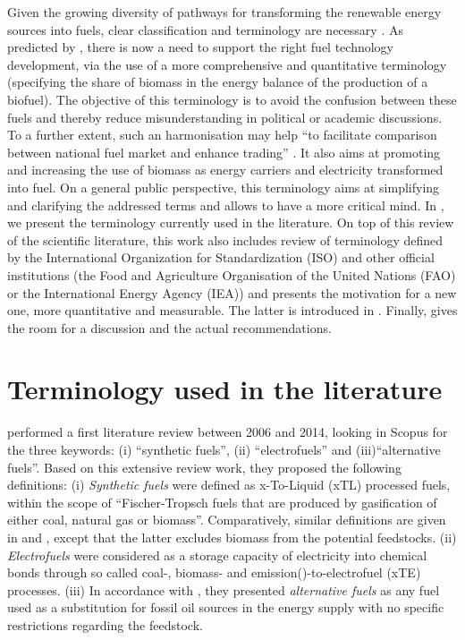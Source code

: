 Given the growing diversity of pathways for transforming the renewable energy sources into fuels, clear classification and terminology are necessary \cite{bailera2017}. As predicted by \citet{ridjan2016}, there is now a need to support the right fuel technology development, via the use of a more comprehensive and quantitative terminology (\eg specifying the share of biomass in the energy balance of the production of a biofuel). The objective of this terminology is to avoid the confusion between these fuels and thereby reduce misunderstanding in political or academic discussions. To a further extent, such an harmonisation may help ``to facilitate comparison between national fuel market and enhance trading'' \cite{FAO_biofuel}. It also aims at promoting and increasing the use of biomass as energy carriers and electricity transformed into fuel. On a general public perspective, this terminology aims at simplifying and clarifying the addressed terms and allows to have a more critical mind. In , we present the terminology currently used in the literature. On top of this review of the scientific literature, this work also includes review of terminology defined by the International Organization for Standardization (ISO) and other official institutions (\eg the Food and Agriculture Organisation of the United Nations (FAO) or the International Energy Agency (IEA)) and presents the motivation for a new one, more quantitative and measurable. The latter is introduced in . Finally,  gives the room for a discussion and the actual recommendations.

\section{Terminology used in the literature}
\label{sec:lit_review}
\citet{ridjan2016} performed a first literature review between 2006 and 2014, looking in Scopus for the three keywords: (i) ``synthetic fuels'', (ii) ``electrofuels'' and (iii)``alternative fuels''. Based on this extensive review work, they proposed the following definitions: (i) \textit{Synthetic fuels} were defined as x-To-Liquid (xTL) processed fuels, within the scope of ``Fischer-Tropsch fuels that are produced by gasification of either coal, natural gas or biomass''. Comparatively, similar definitions are given in \cite{eia2006} and \cite{iea2007}, except that the latter excludes biomass from the potential feedstocks.
(ii) \textit{Electrofuels} were considered  as a storage capacity of electricity into chemical bonds through so called coal-, biomass- and emission()-to-electrofuel (xTE) processes. 
(iii) In accordance with \cite{european2013proposal}, they presented \textit{alternative fuels} as any fuel used as a substitution for fossil oil sources in the energy supply with no specific restrictions regarding the feedstock. 

